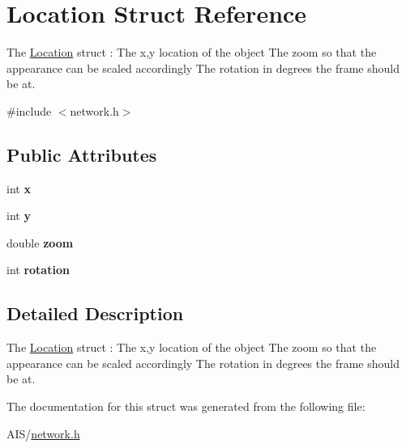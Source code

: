 \hypertarget{struct_location}{}\section{Location Struct Reference}
\label{struct_location}


The \hyperlink{struct_location}{Location} struct \+: The x,y location of the object The zoom so that the appearance can be scaled accordingly The rotation in degrees the frame should be at.  




{\ttfamily \#include $<$network.\+h$>$}

\subsection*{Public Attributes}
\begin{DoxyCompactItemize}
\item 
\hypertarget{struct_location_aea76eebc474e30c04c53e5f03c6749e3}{}int {\bfseries x}\label{struct_location_aea76eebc474e30c04c53e5f03c6749e3}

\item 
\hypertarget{struct_location_a307809776b981810147af56d9304e273}{}int {\bfseries y}\label{struct_location_a307809776b981810147af56d9304e273}

\item 
\hypertarget{struct_location_a281a87256af782ab14e370b8fca42286}{}double {\bfseries zoom}\label{struct_location_a281a87256af782ab14e370b8fca42286}

\item 
\hypertarget{struct_location_a074566b9d5b112113b5354eeb1860e19}{}int {\bfseries rotation}\label{struct_location_a074566b9d5b112113b5354eeb1860e19}

\end{DoxyCompactItemize}


\subsection{Detailed Description}
The \hyperlink{struct_location}{Location} struct \+: The x,y location of the object The zoom so that the appearance can be scaled accordingly The rotation in degrees the frame should be at. 

The documentation for this struct was generated from the following file\+:\begin{DoxyCompactItemize}
\item 
A\+I\+S/\hyperlink{network_8h}{network.\+h}\end{DoxyCompactItemize}
